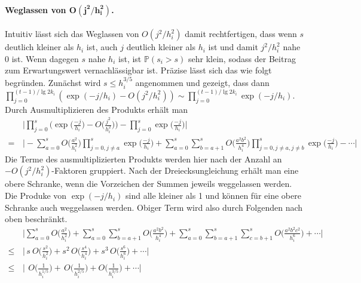 \documentclass[a4paper, 10pt, ngerman]{article}
\renewcommand{\P}{\mathbb{P}}
\begin{document}
\paragraph{Weglassen von $\pmb{O(j^2/h_i^2)}$.} Intuitiv lässt sich das Weglassen von $O(j^2/h_i^2)$ damit rechtfertigen, dass wenn $s$ deutlich kleiner als $h_i$ ist, auch $j$ deutlich kleiner als $h_i$ ist und damit $j^2/h_i^2$ nahe 0 ist. Wenn dagegen $s$ nahe $h_i$ ist, ist $\P(s_i > s)$ sehr klein, sodass der Beitrag zum Erwartungswert vernachlässigbar ist. Präzise lässt sich das wie folgt begründen. Zunächst wird $s \le h_{i}^{3/5}$ angenommen und gezeigt, dass dann $\prod_{j = 0}^{(t-1) / \lg 2k_i} (\exp (-j/h_i) - O (j^2/h_i^2)) \sim \prod_{j = 0}^{(t-1) / \lg 2k_i} \exp (-j/h_i)$. Durch Ausmultiplizieren des Produkts erhält man
\begin{align*}
         & \Bigg \vert \prod_{j = 0}^{s} \Bigg ( \exp \bigg ( \frac {-j}{h_i} \bigg ) - O \bigg ( \frac {j^2} {h_i^2} \bigg ) \Bigg ) - \prod_{j = 0}^{s} \exp \bigg ( \frac {-j}{h_i} \bigg ) \Bigg \vert \\
    = \, & \Bigg \vert - \sum_{a = 0}^{s} O \bigg ( \frac {a^2} {h_i^2} \bigg ) \prod_{j = 0, j \ne a}^{s} \exp \bigg ( \frac {-j}{h_i} \bigg ) +
    \sum_{a = 0}^{s} \sum_{b = a + 1}^{s} O \bigg ( \frac {a^2b^2} {h_i^4} \bigg ) \prod_{j = 0, j \ne a, j \ne b}^{s} \exp \bigg ( \frac {-j}{h_i} \bigg ) - \cdots \Bigg \vert
\end{align*}
Die Terme des ausmultiplizierten Produkts werden hier nach der Anzahl an $-O(j^2/h_i^2)$-Faktoren gruppiert. Nach der Dreiecksungleichung erhält man eine obere Schranke, wenn die Vorzeichen der Summen jeweils weggelassen werden. Die Produke von $\exp(-j/h_i)$ sind alle kleiner als 1 und können für eine obere Schranke auch weggelassen werden. Obiger Term wird also durch Folgenden nach oben beschränkt.
\begin{align*}
           & \Bigg \vert \sum_{a = 0}^{s} O \bigg ( \frac {a^2} {h_i^2} \bigg ) +
    \sum_{a = 0}^{s} \sum_{b = a + 1}^{s} O \bigg ( \frac {a^2b^2} {h_i^4} \bigg ) + \sum_{a = 0}^{s} \sum_{b = a + 1}^{s} \sum_{c = b + 1}^{s} O \bigg ( \frac {a^2b^2c^2} {h_i^6} \bigg ) + \cdots \Bigg \vert \\
    \le \, & \Bigg \vert \, s \ O \bigg ( \frac {s^2} {h_i^2} \bigg ) +
    s^2 \, O \bigg ( \frac {s^4} {h_i^4} \bigg ) + s^3 \,  O \bigg ( \frac {s^6} {h_i^6} \bigg ) + \cdots \Bigg \vert                                                                                            \\
    \le \, & \Bigg \vert \, \ O \bigg ( \frac 1 {h_i^{1/5}} \bigg ) + \, O \bigg ( \frac 1 {h_i^{2/5}} \bigg ) +  O \bigg ( \frac 1 {h_i^{3/5}} \bigg ) + \cdots \Bigg \vert
\end{align*}
\end{document}
